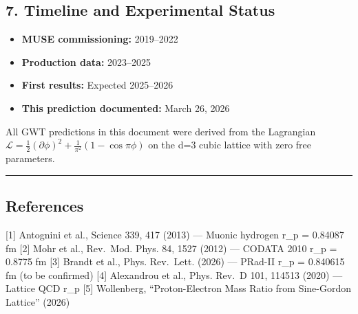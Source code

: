 \documentclass[
]{article}
\providecommand{\tightlist}{%
  \setlength{\itemsep}{0pt}\setlength{\parskip}{0pt}}
\begin{document}
\subsection{7. Timeline and Experimental
Status}\label{timeline-and-experimental-status}

\begin{itemize}
\tightlist
\item
  \textbf{MUSE commissioning:} 2019--2022
\item
  \textbf{Production data:} 2023--2025
\item
  \textbf{First results:} Expected 2025--2026
\item
  \textbf{This prediction documented:} March 26, 2026
\end{itemize}

All GWT predictions in this document were derived from the Lagrangian
\(\mathcal{L} = \frac{1}{2}(\partial\phi)^2 + \frac{1}{\pi^2}(1-\cos\pi\phi)\)
on the d=3 cubic lattice with zero free parameters.

\begin{center}\rule{0.5\linewidth}{0.5pt}\end{center}

\subsection{References}\label{references}

{[}1{]} Antognini et al., Science 339, 417 (2013) --- Muonic hydrogen
r\_p = 0.84087 fm {[}2{]} Mohr et al., Rev.~Mod. Phys. 84, 1527 (2012)
--- CODATA 2010 r\_p = 0.8775 fm {[}3{]} Brandt et al., Phys. Rev.~Lett.
(2026) --- PRad-II r\_p = 0.840615 fm (to be confirmed) {[}4{]}
Alexandrou et al., Phys. Rev.~D 101, 114513 (2020) --- Lattice QCD r\_p
{[}5{]} Wollenberg, ``Proton-Electron Mass Ratio from Sine-Gordon
Lattice'' (2026)
\end{document}
